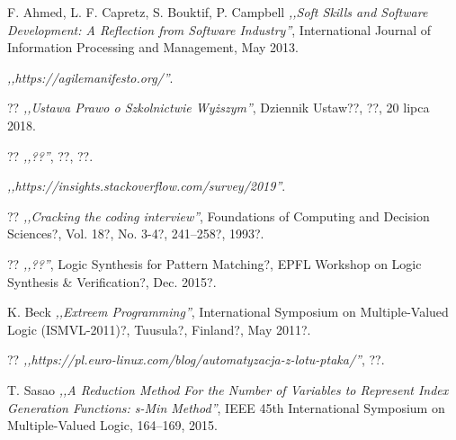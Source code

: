 
\begin{thebibliography}{99}


 F. Ahmed, L. F. Capretz, S. Bouktif, P. Campbell \emph{,,Soft Skills and Software Development: A Reflection from Software Industry''}, International Journal of Information Processing and Management, May 2013.

 \emph{,,https://agilemanifesto.org/''}.

 ?? \emph{,,Ustawa Prawo o Szkolnictwie Wyższym''}, Dziennik Ustaw??, ??, 20 lipca 2018.

 ??  \emph{,,??''}, ??, ??.

 \emph{,,https://insights.stackoverflow.com/survey/2019''}.

 ?? \emph{,,Cracking the coding interview''}, Foundations of Computing and Decision Sciences?, Vol. 18?, No. 3-4?, 241–258?, 1993?.

 ?? \emph{,,??''}, Logic Synthesis for Pattern Matching?, EPFL Workshop on Logic Synthesis \& Verification?, Dec. 2015?.

 K. Beck \emph{,,Extreem Programming''}, International Symposium on Multiple-Valued Logic (ISMVL-2011)?, Tuusula?, Finland?, May 2011?.

 ?? \emph{,,https://pl.euro-linux.com/blog/automatyzacja-z-lotu-ptaka/''}, ??.

 T. Sasao \emph{,,A Reduction Method For the Number of Variables to Represent Index Generation Functions: s-Min Method''}, IEEE 45th International Symposium on Multiple-Valued Logic, 164–169, 2015.


\end{thebibliography}
